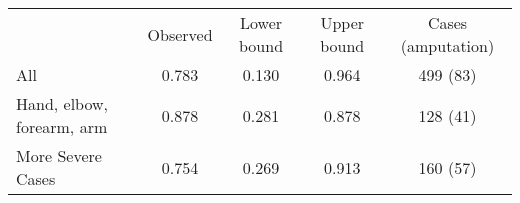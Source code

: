 \begin{tabular}{lcccc} \hline
                          &  Observed & Lower bound & Upper bound & Cases (amputation) \\
All                       & 0.783     & 0.130       & 0.964       & 499 (83)       \\
Hand, elbow, forearm, arm & 0.878     & 0.281       & 0.878       & 128 (41)        \\
More Severe Cases         & 0.754     & 0.269       & 0.913       & 160 (57)        \\ \hline
\end{tabular}
